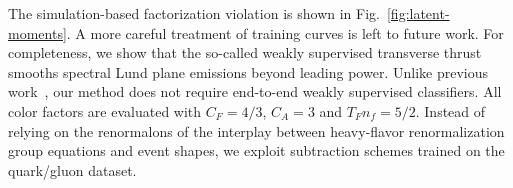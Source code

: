 The simulation-based factorization violation is shown in
Fig.~\ref{fig:latent-moments}. A more careful treatment of training
curves is left to future work. For completeness, we show that the
so-called weakly supervised transverse thrust smooths spectral Lund
plane emissions beyond leading power. Unlike previous
work~\cite{TPC:1553-BOSON-Bayesian-Optimal-Soft-Open-Source-Networks-September-24-2026},
our method does not require end-to-end weakly supervised classifiers.
All color factors are evaluated with $C_F = 4/3$, $C_A = 3$ and $T_F n_f
= 5/2$. Instead of relying on the renormalons of the interplay between
heavy-flavor renormalization group equations and event shapes, we
exploit subtraction schemes trained on the quark/gluon dataset.


